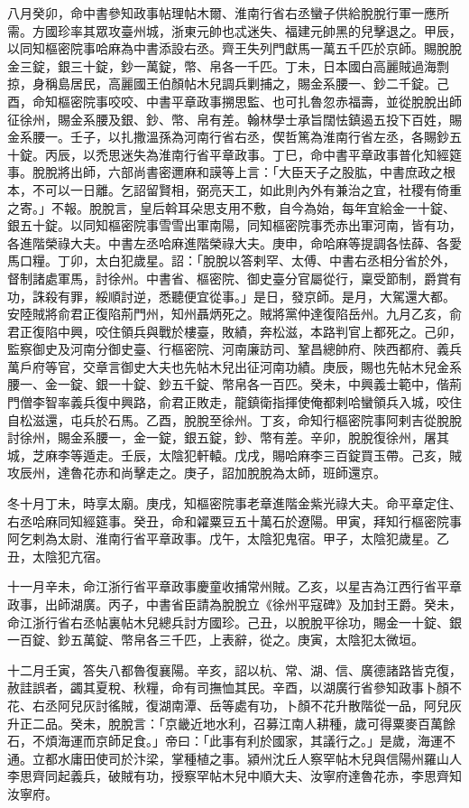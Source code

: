 \begin{pinyinscope}
 八月癸卯，命中書參知政事帖理帖木爾、淮南行省右丞蠻子供給脫脫行軍一應所需。方國珍率其眾攻臺州城，浙東元帥也忒迷失、福建元帥黑的兒擊退之。甲辰，以同知樞密院事哈麻為中書添設右丞。齊王失列門獻馬一萬五千匹於京師。賜脫脫金三錠，銀三十錠，鈔一萬錠，幣、帛各一千匹。丁未，日本國白高麗賊過海剽掠，身稱島居民，高麗國王伯顏帖木兒調兵剿捕之，賜金系腰一、鈔二千錠。己酉，命知樞密院事咬咬、中書平章政事搠思監、也可扎魯忽赤福壽，並從脫脫出師征徐州，賜金系腰及銀、鈔、幣、帛有差。翰林學士承旨闊怯鎮遏五投下百姓，賜金系腰一。壬子，以扎撒溫孫為河南行省右丞，偰哲篤為淮南行省左丞，各賜鈔五十錠。丙辰，以禿思迷失為淮南行省平章政事。丁巳，命中書平章政事普化知經筵事。脫脫將出師，六部尚書密邇麻和謨等上言：「大臣天子之股肱，中書庶政之根本，不可以一日離。乞詔留賢相，弼亮天工，如此則內外有兼治之宜，社稷有倚重之寄。」不報。脫脫言，皇后斡耳朵思支用不敷，自今為始，每年宜給金一十錠、銀五十錠。以同知樞密院事雪雪出軍南陽，同知樞密院事禿赤出軍河南，皆有功，各進階榮祿大夫。中書左丞哈麻進階榮祿大夫。庚申，命哈麻等提調各怯薛、各愛馬口糧。丁卯，太白犯歲星。詔：「脫脫以答剌罕、太傅、中書右丞相分省於外，督制諸處軍馬，討徐州。中書省、樞密院、御史臺分官屬從行，稟受節制，爵賞有功，誅殺有罪，綏順討逆，悉聽便宜從事。」是日，發京師。是月，大駕還大都。安陸賊將俞君正復陷荊門州，知州聶炳死之。賊將黨仲達復陷岳州。九月乙亥，俞君正復陷中興，咬住領兵與戰於樓臺，敗績，奔松滋，本路判官上都死之。己卯，監察御史及河南分御史臺、行樞密院、河南廉訪司、鞏昌總帥府、陜西都府、義兵萬戶府等官，交章言御史大夫也先帖木兒出征河南功績。庚辰，賜也先帖木兒金系腰一、金一錠、銀一十錠、鈔五千錠、幣帛各一百匹。癸未，中興義士範中，偕荊門僧李智率義兵復中興路，俞君正敗走，龍鎮衛指揮使俺都剌哈蠻領兵入城，咬住自松滋還，屯兵於石馬。乙酉，脫脫至徐州。丁亥，命知行樞密院事阿剌吉從脫脫討徐州，賜金系腰一，金一錠，銀五錠，鈔、幣有差。辛卯，脫脫復徐州，屠其城，芝麻李等遁走。壬辰，太陰犯軒轅。戊戌，賜哈麻李三百錠買玉帶。己亥，賊攻辰州，達魯花赤和尚擊走之。庚子，詔加脫脫為太師，班師還京。



 冬十月丁未，時享太廟。庚戌，知樞密院事老章進階金紫光祿大夫。命平章定住、右丞哈麻同知經筵事。癸丑，命和糴粟豆五十萬石於遼陽。甲寅，拜知行樞密院事阿乞剌為太尉、淮南行省平章政事。戊午，太陰犯鬼宿。甲子，太陰犯歲星。乙丑，太陰犯亢宿。



 十一月辛未，命江浙行省平章政事慶童收捕常州賊。乙亥，以星吉為江西行省平章政事，出師湖廣。丙子，中書省臣請為脫脫立《徐州平寇碑》及加封王爵。癸未，命江浙行省右丞帖裏帖木兒總兵討方國珍。己丑，以脫脫平徐功，賜金一十錠、銀一百錠、鈔五萬錠、幣帛各三千匹，上表辭，從之。庚寅，太陰犯太微垣。



 十二月壬寅，答失八都魯復襄陽。辛亥，詔以杭、常、湖、信、廣德諸路皆克復，赦詿誤者，蠲其夏稅、秋糧，命有司撫恤其民。辛酉，以湖廣行省參知政事卜顏不花、右丞阿兒灰討徭賊，復湖南潭、岳等處有功，卜顏不花升散階從一品，阿兒灰升正二品。癸未，脫脫言：「京畿近地水利，召募江南人耕種，歲可得粟麥百萬餘石，不煩海運而京師足食。」帝曰：「此事有利於國家，其議行之。」是歲，海運不通。立都水庸田使司於汴梁，掌種植之事。潁州沈丘人察罕帖木兒與信陽州羅山人李思齊同起義兵，破賊有功，授察罕帖木兒中順大夫、汝寧府達魯花赤，李思齊知汝寧府。



\end{pinyinscope}